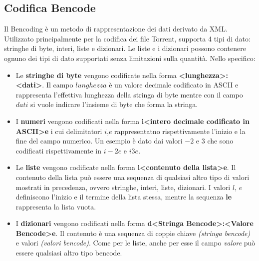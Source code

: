 \documentclass[a4]{book}
\begin{document}
\subsection{Codifica Bencode}
Il Bencoding è un metodo di rappresentazione dei dati derivato da XML. Utilizzato principalmente per la codifica dei file Torrent, supporta 4 tipi di dato: stringhe di byte, interi, liste e dizionari. Le liste e i dizionari possono contenere ognuno dei tipi di dato supportati senza limitazioni sulla quantità. Nello specifico:
\begin{itemize}

\item Le \textbf{stringhe di byte} vengono codificate nella forma \textbf{<lunghezza>:<dati>}. Il campo $lunghezza$ è un valore decimale codificato in ASCII e rappresenta l'effettiva lunghezza della stringa di byte mentre con il campo $dati$ si vuole indicare l'insieme di byte che forma la stringa.
\item I \textbf{numeri} vengono codificati nella forma \textbf{i<intero decimale codificato in ASCII>e} i cui delimitatori $i$,$e$ rappresentatno rispettivamente l'inizio e la fine del campo numerico. Un esempio è dato dai valori $-2$ e $3$ che sono codificati rispettivamente in $i-2e$ e $i3e$.
\item Le \textbf{liste} vengono codificate nella forma \textbf{l<contenuto della lista>e}. Il contenuto della lista può essere una sequenza di qualsiasi altro tipo di valori mostrati in precedenza, ovvero stringhe, interi, liste, dizionari. I valori $l$, $e$ definiscono l'inizio e il termine della lista stessa, mentre la sequenza \textbf{le} rappresenta la lista vuota.
\item I \textbf{dizionari} vengono codificati nella forma \textbf{d<Stringa Bencode>:<Valore Bencode>e}. Il contenuto è una sequenza di coppie chiave \textit{(stringa bencode)} e valori \textit{(valori bencode)}. Come per le liste, anche per esse il campo \textit{valore} può essere qualsiasi altro tipo bencode.\newline
\end{itemize}
\end{document}
